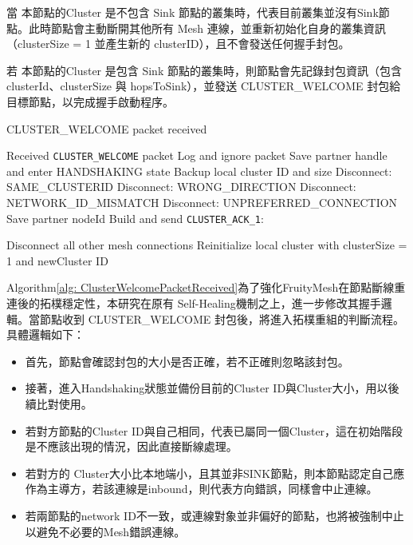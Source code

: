 \begin{ZhChapter}
當 本節點的Cluster 是不包含 Sink 節點的叢集時，代表目前叢集並沒有Sink節點。此時節點會主動斷開其他所有 Mesh 連線，並重新初始化自身的叢集資訊（clusterSize = 1 並產生新的 clusterID），且不會發送任何握手封包。

若 本節點的Cluster 是包含 Sink 節點的叢集時，則節點會先記錄封包資訊（包含 clusterId、clusterSize 與 hopsToSink），並發送 CLUSTER\_WELCOME 封包給目標節點，以完成握手啟動程序。


\begin{algorithm}[H]
\caption{CLUSTER\_WELCOME packet received}
\label{alg: ClusterWelcomePacketReceived}
\begin{algorithmic}[1]
\Require Received \texttt{CLUSTER\_WELCOME} packet
    \State Log and ignore packet
\Else
    \State Save partner handle and enter HANDSHAKING state
    \State Backup local cluster ID and size
        \State Disconnect: SAME\_CLUSTERID
            \State Disconnect: WRONG\_DIRECTION
        \EndIf
        \State Disconnect: NETWORK\_ID\_MISMATCH
        \State Disconnect: UNPREFERRED\_CONNECTION
    \Else
        \State Save partner nodeId
        \State Build and send \texttt{CLUSTER\_ACK\_1}:

        \State Disconnect all other mesh connections
        \State Reinitialize local cluster with clusterSize = 1 and newCluster ID
    \EndIf
\EndIf
\end{algorithmic}
\end{algorithm}

Algorithm\ref{alg: ClusterWelcomePacketReceived}為了強化FruityMesh在節點斷線重連後的拓樸穩定性，本研究在原有 Self-Healing機制之上，進一步修改其握手邏輯。當節點收到 CLUSTER\_WELCOME 封包後，將進入拓樸重組的判斷流程。具體邏輯如下：

\begin{itemize}
    \item 首先，節點會確認封包的大小是否正確，若不正確則忽略該封包。
    \item 接著，進入Handshaking狀態並備份目前的Cluster ID與Cluster大小，用以後續比對使用。
    \item 若對方節點的Cluster ID與自己相同，代表已屬同一個Cluster，這在初始階段是不應該出現的情況，因此直接斷線處理。
    \item 若對方的 Cluster大小比本地端小，且其並非SINK節點，則本節點認定自己應作為主導方，若該連線是inbound，則代表方向錯誤，同樣會中止連線。
    \item 若兩節點的network ID不一致，或連線對象並非偏好的節點，也將被強制中止以避免不必要的Mesh錯誤連線。
\end{itemize}


\end{ZhChapter}
